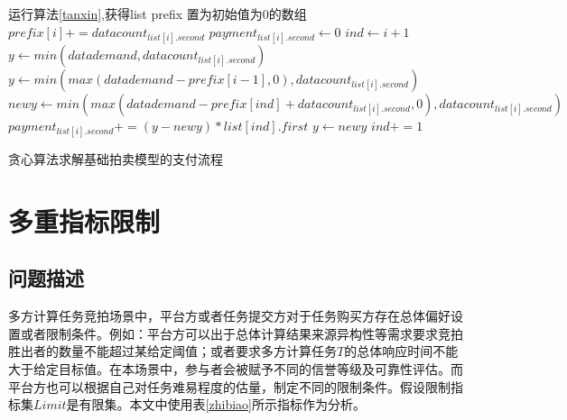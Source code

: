 \documentclass[promaster]{thesis-uestc}
\begin{document}
\begin{algorithm}[H]
    运行算法\ref{tanxin},获得list\;
    prefix 置为初始值为0的数组\;
    {
        $prefix[i]  += datacount_{list[i].second}$\;
    }
    {
        $payment_{list[i].second} \leftarrow 0$\;
        $ind \leftarrow i + 1$
        {
            $y \leftarrow min(datademand,datacount_{list[i].second})$\;
        }{
        $y \leftarrow min(max(datademand - prefix[i-1],0),datacount_{list[i].second})$\;
        }
        {
            $newy \leftarrow min(max(datademand - prefix[ind]+ datacount_{list[i].second},0),datacount_{list[i].second})$\;
            $payment_{list[i].second} += (y - newy)*list[ind].first$\;
            $y \leftarrow newy$\;
            $ind += 1$\;
        }
    }
\caption{贪心算法求解基础拍卖模型的支付流程}
\label{tanxin_zhifu}
\end{algorithm}

\section{多重指标限制}
\label{dptou}
\subsection{问题描述}
    多方计算任务竞拍场景中，平台方或者任务提交方对于任务购买方存在总体偏好设置或者限制条件。例如：平台方可以出于总体计算结果来源异构性等需求要求竞拍胜出者的数量不能超过某给定阈值；或者要求多方计算任务$T$的总体响应时间不能大于给定目标值。在本场景中，参与者会被赋予不同的信誉等级及可靠性评估。而平台方也可以根据自己对任务难易程度的估量，制定不同的限制条件。假设限制指标集$Limit$是有限集。本文中使用表\ref{zhibiao}所示指标作为分析。

\newcommand{\tabincell}[2]{\begin{tabular}{@{}#1@{}}#2\end{tabular}} %
\end{document}
